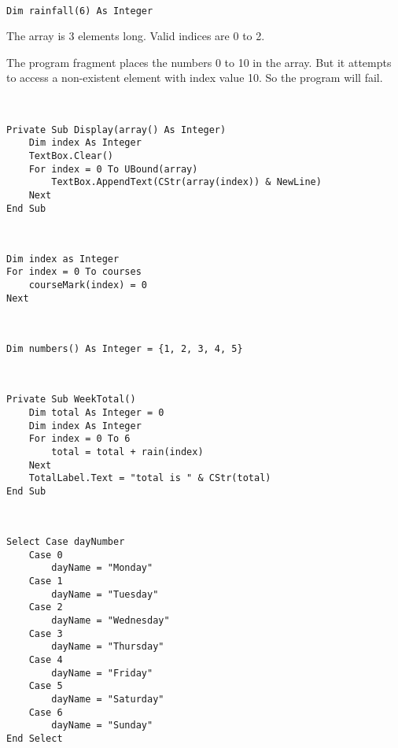 
			\begin{stab}
				\begin{enumChapter}
				\item \
					\begin{lstlisting}
Dim rainfall(6) As Integer
					\end{lstlisting}
				\item	The array is 3 elements long. Valid indices are 0 to 2.
				\item The program fragment places the numbers 0 to 10 in the array. But it attempts to access a non-existent element with index value 10. So the program will fail.
				\item \
					\begin{lstlisting}
Private Sub Display(array() As Integer)
	Dim index As Integer
	TextBox.Clear()
	For index = 0 To UBound(array)
		TextBox.AppendText(CStr(array(index)) & NewLine)
	Next
End Sub
					\end{lstlisting}
				\item \
					\begin{lstlisting}
Dim index as Integer
For index = 0 To courses
	courseMark(index) = 0
Next
					\end{lstlisting}
				\item \ 
					\begin{lstlisting}
Dim numbers() As Integer = {1, 2, 3, 4, 5}
					\end{lstlisting}
				\item \
					\begin{lstlisting}
Private Sub WeekTotal()
	Dim total As Integer = 0
	Dim index As Integer
	For index = 0 To 6
		total = total + rain(index)
	Next
	TotalLabel.Text = "total is " & CStr(total)
End Sub
					\end{lstlisting}
				\item \
					\begin{lstlisting}
Select Case dayNumber
	Case 0
		dayName = "Monday"
	Case 1
		dayName = "Tuesday"
	Case 2
		dayName = "Wednesday"
	Case 3
		dayName = "Thursday"
	Case 4
		dayName = "Friday"
	Case 5
		dayName = "Saturday"
	Case 6
		dayName = "Sunday"
End Select
					\end{lstlisting}
				\end{enumChapter}
			\end{stab}

